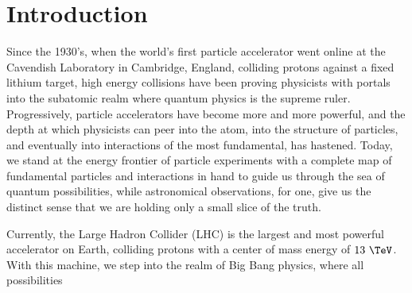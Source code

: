 \chapter{Introduction}

Since the 1930's, when the world's first particle accelerator went online at the Cavendish Laboratory in Cambridge, England, colliding protons against a fixed lithium target, high energy collisions have been proving physicists with portals into the subatomic realm where quantum physics is the supreme ruler.  Progressively, particle accelerators have become more and more powerful, and the depth at which physicists can peer into the atom, into the structure of particles, and eventually into interactions of the most fundamental, has hastened.  Today, we stand at the energy frontier of particle experiments with a complete map of fundamental particles and interactions in hand to guide us through the sea of quantum possibilities, while astronomical observations, for one, give us the distinct sense that we are holding only a small slice of the truth.  

Currently, the Large Hadron Collider (LHC) is the largest and most powerful accelerator on Earth, colliding protons with a center of mass energy of $13~\TeV$.  With this machine, we step into the realm of Big Bang physics, where all possibilities 




